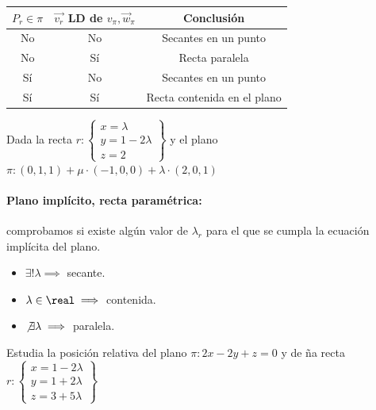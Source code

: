 \begin{center}
\begin{tabular}{ccc}
$P_r \in \pi $ & $\vec{v_r}$ LD de $v_{\pi}, \vec{w}_{\pi}$ & \textbf{Conclusión}\\\hline
No & No & Secantes en un punto\\
No & Sí & Recta paralela\\
Sí & No & Secantes en un punto\\
Sí & Sí & Recta contenida en el plano\\
\end{tabular}
\end{center}

\begin{problem}
Dada la recta $r: \left\{\begin{array}{c}
    x=\lambda\\
    y=1-2\lambda\\
    z=2
\end{array}\right\}$ y el plano $\pi: (0,1,1) + \mu\cdot (-1,0,0) + \lambda\cdot(2,0,1)$ 
\solution

\end{problem}

\paragraph{Plano implícito, recta paramétrica: } comprobamos si existe algún valor de $\lambda_{r}$ para el que se cumpla la ecuación implícita del plano. 
\begin{itemize}
  \item $\exists!\lambda \implies $ secante.
  \item $\lambda \in \real \implies$ contenida.
  \item $\not\exists \lambda \implies $ paralela.
\end{itemize}
\begin{problem}
Estudia la posición relativa del plano $\pi: 2x-2y+z=0$ y de ña recta $r:\left\{\begin{array}{c}
     x=1-2\lambda\\
     y=1+2\lambda\\
     z=3+5\lambda 
\end{array}\right\}$
\solution


\end{problem}

